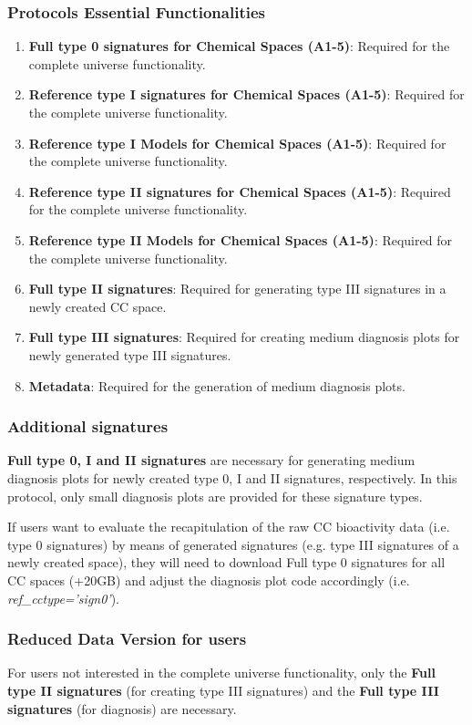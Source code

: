 \subsubsection{Protocols Essential Functionalities}
\begin{enumerate}
    \item \textbf{Full type 0 signatures for Chemical Spaces (A1-5)}: Required for the complete universe functionality. 
    \item \textbf{Reference type I signatures for Chemical Spaces (A1-5)}: Required for the complete universe functionality.
    \item \textbf{Reference type I Models for Chemical Spaces (A1-5)}: Required for the complete universe functionality.
    \item \textbf{Reference type II signatures for Chemical Spaces (A1-5)}: Required for the complete universe functionality.
    \item \textbf{Reference type II Models for Chemical Spaces (A1-5)}: Required for the complete universe functionality.
    \item \textbf{Full type II signatures}: Required for generating type III signatures in a newly created CC space.
    \item \textbf{Full type III signatures}: Required for creating medium diagnosis plots for newly generated type III signatures.
    \item \textbf{Metadata}: Required for the generation of medium diagnosis plots.
    
\end{enumerate}

\subsubsection{Additional signatures}

\textbf{Full type 0, I and II signatures} are necessary for generating medium diagnosis plots for newly created type 0, I and II signatures, respectively. In this protocol, only small diagnosis plots are provided for these signature types. 

If users want to evaluate the recapitulation of the raw CC bioactivity data (i.e. type 0 signatures) by means of generated signatures (e.g. type III signatures of a newly created space), they will need to download Full type 0 signatures for all CC spaces (+20GB) and adjust the diagnosis plot code accordingly (i.e. \textit{ref\_cctype=’sign0’}).

\subsubsection{Reduced Data Version for users}

For users not interested in the complete universe functionality, only the \textbf{Full type II signatures} (for creating type III signatures) and the \textbf{Full type III signatures }(for diagnosis) are necessary. 

